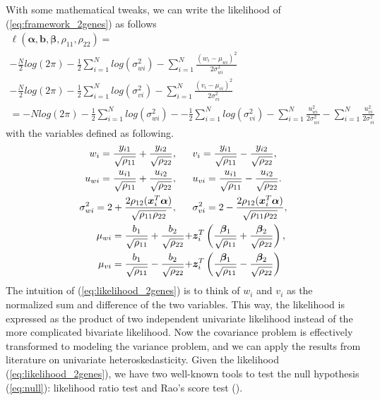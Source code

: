 \documentclass[aap,authoryear, preprint]{imsart}
\numberwithin{equation}{section}
\theoremstyle{plain}
\begin{document}
With some mathematical tweaks, we can write the likelihood of (\ref{eq:framework_2genes}) as follows
\begin{equation}
\begin{multlined}
\ell(\bm{\alpha}, \bm{b}, \bm{\beta}, \rho_{11}, \rho_{22}) = \\
-\frac{N}{2} log(2\pi) - \frac{1}{2} \sum_{i=1}^{N} log (\sigma_{wi}^2) - \sum_{i=1}^{N} \frac{(w_i - \mu_{wi})^2}{2\sigma_{wi}^2}\\
-\frac{N}{2} log(2\pi) - \frac{1}{2} \sum_{i=1}^{N} log (\sigma_{vi}^2) - \sum_{i=1}^{N} \frac{(v_i - \mu_{vi})^2}{2\sigma_{vi}^2}\\
= -Nlog(2\pi) - \frac{1}{2} \sum_{i=1}^{N}log(\sigma_{wi}^2) - - \frac{1}{2} \sum_{i=1}^{N} log(\sigma_{vi}^2) - \sum_{i=1}^{N} \frac{u_{wi}^2}{2\sigma_{wi}^2} - \sum_{i=1}^{N} \frac{u_{vi}^2}{2\sigma_{vi}^2}
\end{multlined}
    \label{eq:likelihood_2genes}
\end{equation}
with the variables defined as following.
\begin{align*}
w_i = \frac{y_{i1}}{\sqrt{\rho_{11}}} + \frac{y_{i2}}{\sqrt{\rho_{22}}}, 
\hspace{6mm} &
v_i = \frac{y_{i1}}{\sqrt{\rho_{11}}} - \frac{y_{i2}}{\sqrt{\rho_{22}}},\\
u_{wi} = \frac{u_{i1}}{\sqrt{\rho_{11}}} + \frac{u_{i2}}{\sqrt{\rho_{22}}}, 
\hspace{6mm} &
u_{vi} = \frac{u_{i1}}{\sqrt{\rho_{11}}} - \frac{u_{i2}}{\sqrt{\rho_{22}}}.\\
\sigma_{wi}^2 = 2 + \frac{2\rho_{12}(\bm{x}_i^T \bm{\alpha})}{\sqrt{\rho_{11}\rho_{22}}}, \hspace{6mm}&
\sigma_{vi}^2 = 2 - \frac{2\rho_{12}(\bm{x}_i^T \bm{\alpha})}{\sqrt{\rho_{11}\rho_{22}}},\\
\mu_{wi} = \frac{{b}_1}{\sqrt{\rho_{11}}} + \frac{{b}_2}{\sqrt{\rho_{22}}} + &\bm{z}_i^T \left(\frac{\bm{\beta}_1}{\sqrt{\rho_{11}}} + \frac{\bm{\beta}_2}{\sqrt{\rho_{22}}}\right),\\
\mu_{vi} = \frac{{b}_1}{\sqrt{\rho_{11}}} - \frac{{b}_2}{\sqrt{\rho_{22}}} + &\bm{z}_i^T \left(\frac{\bm{\beta}_1}{\sqrt{\rho_{11}}} - \frac{\bm{\beta}_2}{\sqrt{\rho_{22}}}\right)
\end{align*}
The intuition of (\ref{eq:likelihood_2genes}) is to think of $w_i$ and $v_i$ as the normalized sum and difference of the two variables. This way, the likelihood is expressed as the product of two independent univariate likelihood instead of the more complicated bivariate likelihood. Now the covariance problem is effectively transformed to modeling the variance problem, and we can apply the results from literature on univariate heteroskedasticity. Given the likelihood (\ref{eq:likelihood_2genes}), we have two well-known tools to test the null hypothesis (\ref{eq:null}): likelihood ratio test and Rao's score test (\cite{breusch1979simple}). \\
\end{document}
